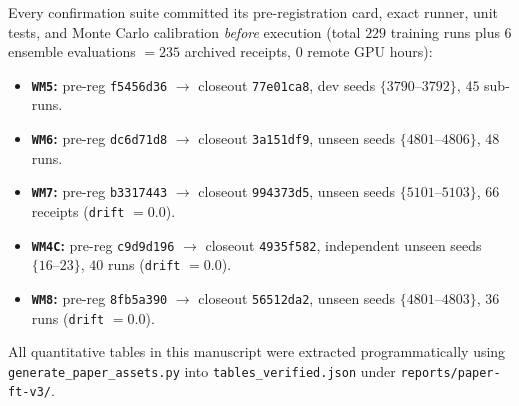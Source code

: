 \documentclass[11pt]{article}
\begin{document}
Every confirmation suite committed its pre-registration card, exact runner, unit tests, and Monte Carlo calibration \emph{before} execution (total $229$ training runs plus $6$ ensemble evaluations $= 235$ archived receipts, $0$ remote GPU hours):
\begin{itemize}
  \item \textbf{\texttt{WM5}:} pre-reg \texttt{f5456d36} $\to$ closeout \texttt{77e01ca8}, dev seeds $\{3790\text{--}3792\}$, $45$ sub-runs.
  \item \textbf{\texttt{WM6}:} pre-reg \texttt{dc6d71d8} $\to$ closeout \texttt{3a151df9}, unseen seeds $\{4801\text{--}4806\}$, $48$ runs.
  \item \textbf{\texttt{WM7}:} pre-reg \texttt{b3317443} $\to$ closeout \texttt{994373d5}, unseen seeds $\{5101\text{--}5103\}$, $66$ receipts (\texttt{drift} $=0.0$).
  \item \textbf{\texttt{WM4C}:} pre-reg \texttt{c9d9d196} $\to$ closeout \texttt{4935f582}, independent unseen seeds $\{16\text{--}23\}$, $40$ runs (\texttt{drift} $=0.0$).
  \item \textbf{\texttt{WM8}:} pre-reg \texttt{8fb5a390} $\to$ closeout \texttt{56512da2}, unseen seeds $\{4801\text{--}4803\}$, $36$ runs (\texttt{drift} $=0.0$).
\end{itemize}
All quantitative tables in this manuscript were extracted programmatically using \texttt{generate\_paper\_assets.py} into \texttt{tables\_verified.json} under \texttt{reports/paper-ft-v3/}.
\end{document}

